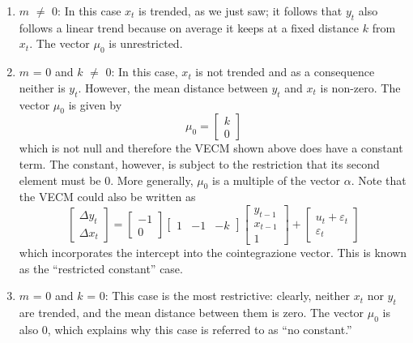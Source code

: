 \begin{enumerate}
\item $m$ $\ne$ 0: In this case $x_t$ is trended, as we just saw; it
  follows that $y_t$ also follows a linear trend because on average it
  keeps at a fixed distance $k$ from $x_t$. The vector $\mu_0$ is
  unrestricted.
	
\item $m$ = 0 and $k$ $\ne$ 0: In this case, $x_t$ is not trended and
  as a consequence neither is $y_t$. However, the mean distance
  between $y_t$ and $x_t$ is non-zero. The vector
  $\mu_0$ is given by
%	  
  \[
  \mu_0 = \left[ \begin{array}{c} k \\ 0 \end{array} \right]
  \]
%	    
  which is not null and therefore the VECM shown above does have a
  constant term. The constant, however, is subject to the restriction
  that its second element must be 0. More generally,
  $\mu_0$ is a multiple of the vector $\alpha$. Note
  that the VECM could also be written as
%	  
  \[
  \left[ \begin{array}{c} \Delta y_t \\ \Delta x_t \end{array} \right]
  = \left[ \begin{array}{r} -1 \\ 0 \end{array} \right] \left[
    \begin{array}{rrr} 1 & -1 & -k \end{array} \right] \left[
    \begin{array}{c} y_{t-1} \\ x_{t-1} \\ 1 \end{array} \right] +
  \left[ \begin{array}{c} u_t + \varepsilon_t \\ \varepsilon_t
    \end{array} \right]
  \]
%	   
  which incorporates the intercept into the cointegrazione vector. This
  is known as the ``restricted constant'' case.
	
\item $m$ = 0 and $k$ = 0: This case is the most restrictive: clearly,
  neither $x_t$ nor $y_t$ are trended, and the mean distance between
  them is zero. The vector $\mu_0$ is also 0, which explains why this
  case is referred to as ``no constant.''
	
\end{enumerate}

